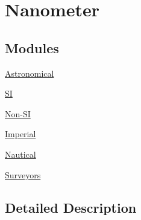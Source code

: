 \hypertarget{group___e_g_x_math-_conversions-_length_conversions-_s_i-_nanometer}{}\section{Nanometer}
\label{group___e_g_x_math-_conversions-_length_conversions-_s_i-_nanometer}
\subsection*{Modules}
\begin{DoxyCompactItemize}
\item 
\mbox{\hyperlink{group___e_g_x_math-_conversions-_length_conversions-_s_i-_nanometer-_astronomical}{Astronomical}}
\item 
\mbox{\hyperlink{group___e_g_x_math-_conversions-_length_conversions-_s_i-_nanometer-_s_i}{SI}}
\item 
\mbox{\hyperlink{group___e_g_x_math-_conversions-_length_conversions-_s_i-_nanometer-_non-_s_i}{Non-\/\+SI}}
\item 
\mbox{\hyperlink{group___e_g_x_math-_conversions-_length_conversions-_s_i-_nanometer-_imperial}{Imperial}}
\item 
\mbox{\hyperlink{group___e_g_x_math-_conversions-_length_conversions-_s_i-_nanometer-_nautical}{Nautical}}
\item 
\mbox{\hyperlink{group___e_g_x_math-_conversions-_length_conversions-_s_i-_nanometer-_surveyors}{Surveyors}}
\end{DoxyCompactItemize}


\subsection{Detailed Description}
